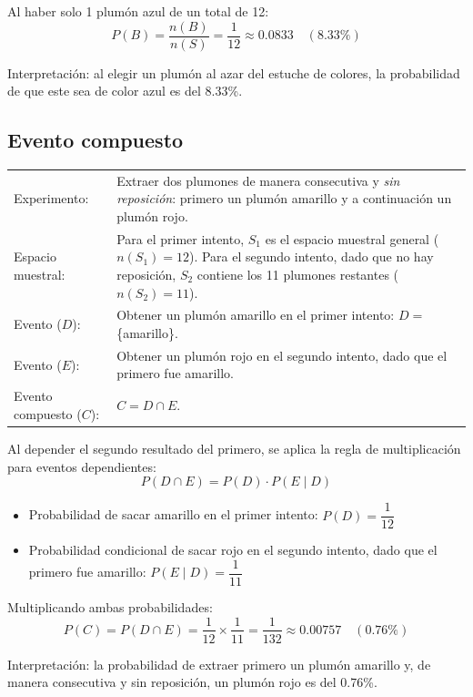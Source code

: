 \documentclass[10pt,letterpaper]{article}
\begin{document}
\noindent Al haber solo 1 plumón azul de un total de 12:
$$P(B) = \frac{n(B)}{n(S)} = \frac{1}{12} \approx 0.0833 \quad (8.33\%)$$

\noindent Interpretación: al elegir un plumón al azar del estuche de colores, la probabilidad de que este sea de color azul es del 8.33\%.

\subsection{Evento compuesto}

\noindent
\begin{tabularx}{\textwidth}{@{}l X@{}}
Experimento: & Extraer dos plumones de manera consecutiva y \textit{sin reposición}: primero un plumón amarillo y a continuación un plumón rojo. \\[6pt]
Espacio muestral: & Para el primer intento, $S_1$ es el espacio muestral general ($n(S_1) = 12$). Para el segundo intento, dado que no hay reposición, $S_2$ contiene los 11 plumones restantes ($n(S_2) = 11$). \\[6pt]
Evento ($D$): & Obtener un plumón amarillo en el primer intento: $D = $ \{amarillo\}. \\[6pt]
Evento ($E$): & Obtener un plumón rojo en el segundo intento, dado que el primero fue amarillo. \\[6pt]
Evento compuesto ($C$): & $C = D \cap E$. \\[6pt]
\end{tabularx}

\noindent Al depender el segundo resultado del primero, se aplica la regla de multiplicación para eventos dependientes:
$$P(D \cap E) = P(D) \cdot P(E \mid D)$$

\begin{itemize}[nosep]
    \item Probabilidad de sacar amarillo en el primer intento: $P(D) = \dfrac{1}{12}$
    \item Probabilidad condicional de sacar rojo en el segundo intento, dado que el primero fue amarillo: $P(E \mid D) = \dfrac{1}{11}$
\end{itemize}

\noindent Multiplicando ambas probabilidades:
$$P(C) = P(D \cap E) = \frac{1}{12} \times \frac{1}{11} = \frac{1}{132} \approx 0.00757 \quad (0.76\%)$$

\noindent Interpretación: la probabilidad de extraer primero un plumón amarillo y, de manera consecutiva y sin reposición, un plumón rojo es del 0.76\%.
\end{document}
